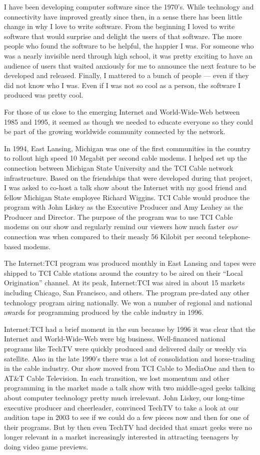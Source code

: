 \documentclass[12pt]{book}
\begin{document}
I have been developing computer software since the 1970's.  While
technology and connectivity have
improved greatly since then, in a sense there has been little change
in why I love to write software.  From the beginning I loved
to write software that would surprise and delight the users of
that software.  The more people who found the software
to be helpful, the happier I was.   For someone who was a nearly
invisible nerd through high school, it was pretty exciting to have
an audience of users that waited anxiously for me to announce
the next feature to be developed and released.  Finally, I mattered
to a bunch of people --- even if they did not know who I was.  Even if
I was not so cool as a person, the software I produced was pretty cool.

For those of us close to the emerging Internet and World-Wide-Web
between 1985 and 1995, it seemed as though we needed to
educate everyone so they could be part of the growing worldwide
community connected by the network.

In 1994, East Lansing, Michigan was one of the first communities
in the country to rollout high speed 10 Megabit per second cable
modems.  I helped set up the connection between Michigan State
University and the TCI Cable network infrastructure.   Based on the
friendships that were developed during that project, I was asked
to co-host a talk show about the Internet with my good friend
and fellow Michigan State employee Richard Wiggins.  TCI Cable
would produce the program with John Liskey as the Executive Producer
and Amy Leahey as the Producer and Director.  The purpose of
the program was to use TCI Cable modems
on our show and regularly remind our viewers how much
faster \emph{our} connection was when compared to their measly
56 Kilobit per second telephone-based modems.

The Internet:TCI program was produced monthly in East Lansing
and tapes were shipped to TCI Cable stations around the
country to be aired on
their ``Local Origination'' channel.   At its peak, Internet:TCI
was aired in about 15 markets including Chicago, San Francisco,
and others.   The program pre-dated any other technology program
airing nationally.  We won a number of regional and national awards
for programming produced by the cable industry in 1996.

Internet:TCI had a brief moment in the sun because by 1996 it
was clear that the Internet and World-Wide-Web were big
business.  Well-financed national programs like TechTV were quickly
produced and delivered daily or weekly via satellite.  Also in the late
1990's there was a lot of consolidation and horse-trading in the cable
industry.   Our show moved from TCI Cable to MediaOne and then to
AT\&T Cable Television.  In each transition, we lost momentum
and other programming in the market made a talk show
with two middle-aged geeks talking about computer technology pretty much
irrelevant.  John Liskey, our long-time executive producer and
cheerleader, convinced TechTV to take a look at our audition
tape in 2003 to see if we could do a few pieces now and then
for one of their programs.  But by then even
TechTV had decided that smart geeks
were no longer relevant in a market increasingly interested in
attracting teenagers by doing video game previews.
\end{document}
